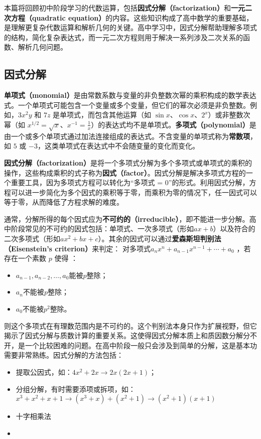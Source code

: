 
本篇将回顾初中阶段学习的代数运算，包括\textbf{因式分解（factorization）}和\textbf{一元二次方程（quadratic equation）}的内容。这些知识构成了高中数学的重要基础，是理解更复杂代数运算和解析几何的关键。高中学习中，因式分解帮助理解多项式的结构，简化复杂表达式，而一元二次方程则用于解决一系列涉及二次关系的函数、解析几何问题。

\subsection{因式分解}

\textbf{单项式（monomial）}是由常数系数与变量的非负整数次幂的乘积构成的数学表达式。一个单项式可能包含一个变量或多个变量，但它们的幂次必须是非负整数。例如，$3x^2y$ 和 $7z$ 是单项式，而包含其他运算（如 $\sin x$、$\cos x$、$2^x$）或非整数次幂（如 $\displaystyle x^{1/2} = \sqrt{x}$、$\displaystyle x^{-1} = \frac{1}{x}$）的表达式均不是单项式。\textbf{多项式（polynomial）}是由一个或多个单项式通过加法连接组成的表达式。不含变量的单项式称为\textbf{常数项}，如 $5$ 或 $-3$，这类单项式在表达式中不会随变量的变化而变化。

\textbf{因式分解（factorization）}是将一个多项式分解为多个多项式或单项式的乘积的操作，这些构成乘积的式子称为\textbf{因式（factor）}。因式分解是解决多项式方程的一个重要工具，因为多项式方程可以转化为“多项式 = 0”的形式。利用因式分解，方程可以进一步简化为多个因式的乘积等于零，而乘积为零的情况下，任一因式可以等于零，从而降低了方程求解的难度。

通常，分解所得的每个因式应为\textbf{不可约的（irreducible）}，即不能进一步分解。高中阶段常见的不可约的因式包括：单项式、一次多项式（形如$ax+b$）以及符合的二次多项式（形如$ax^2+bx+c$）。其余的因式可以通过\textbf{爱森斯坦判别法（Eisenstein's criterion）}来判定：
对多项式$a_n x^n + a_{n-1}x^{n-1} + \cdots + a_0$  ，若存在一个素数  $p$  使得 ：
\begin{itemize}
\item $a_{n-1},a_{n-2},\dots,a_0$能被$p$整除；
\item $a_n$不能被$p$整除；
\item $a_0$不能被$p^2$整除。
\end{itemize}
则这个多项式在有理数范围内是不可约的。这个判别法本身只作为扩展视野，但它揭示了因式分解与质数计算的重要关系。这使得因式分解本质上和质因数分解分不开，是一个比较困难的问题。在高中阶段一般只会涉及到简单的分解，这是基本功需要非常熟练。因式分解的方法包括：
\begin{itemize}
\item 提取公因式，如：$4x^2+2x\to2x(2x+1)$；
\item 分组分解，有时需要添项或拆项，如：$ x^3 + x^2 + x + 1\to (x^3  + x) + (x^2+ 1)\to(x^2 + 1)(x + 1) $
\item 十字相乘法
\item {}
\end{itemize}

